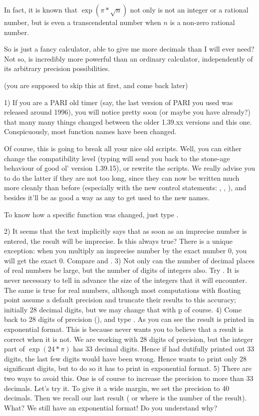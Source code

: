 In fact, it is known that $\exp(\pi*\sqrt{n})$ not only is not an integer or
a rational number, but is even a transcendental number when $n$ is a non-zero
rational number.

So  is just a fancy calculator, able to give me more decimals than I
will ever need? Not so,  is incredibly more powerful than an ordinary
calculator, independently of its arbitrary precision possibilities.

 (you are supposed to skip this at first,
and come back later)

1) If you are a PARI old timer (say, the last version of PARI you used was
released around 1996), you will notice pretty soon (or maybe you have
already?) that many many things changed between the older 1.39.xx versions
and this one. Conspicuously, most function names have been changed.

Of course, this is going to break all your nice old scripts. Well, you can
either change the compatibility level (typing 
will send you back to the stone-age behaviour of good ol' version 1.39.15),
or rewrite the scripts. We really advise you to do the latter if they are not
too long, since they can now be written much more cleanly than before
(especially with the new control statements: , ,
), and besides it'll be as good a way as any to get used to the
new names.

To know how a specific function was changed, just type .

2) It seems that the text implicitly says that as soon as an imprecise number
is entered, the result will be imprecise. Is this always true? There is a
unique exception: when you multiply an imprecise number by the exact number
0, you will get the exact 0. Compare  and .
\smallskip
%
3) Not only can the number of decimal places of real numbers be large, but
the number of digits of integers also. Try . It is never necessary
to tell  in advance the size of the integers that it will encounter.
The same is true for real numbers, although most computations with floating
point assume a default precision and truncate their results to this accuracy;
initially 28 decimal digits, but we may change that with \b{p} of course.
\smallskip
%
4) Come back to 28 digits of precision (), and type
. As you can see the result is printed in exponential format.
This is because  never wants you to believe that a result is correct
when it is not. We are working with 28 digits of precision, but the integer
part of $\exp(24*\pi)$ has 33 decimal digits. Hence if  had dutifully
printed out 33 digits, the last few digits would have been wrong. Hence
 wants to print only 28 significant digits, but to do so it has to
print in exponential format. \smallskip
%
5) There are two ways to avoid this. One is of course to increase the
precision to more than 33 decimals. Let's try it. To give it a wide margin,
we set the precision to 40 decimals. Then we recall our last result (\kbd{\%}
or  where  is the number of the result). What? We still have
an exponential format! Do you understand why?

